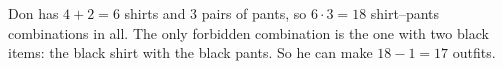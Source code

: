 Don has $4+2=6$ shirts and $3$ pairs of pants, so $6\cdot3=18$ shirt--pants combinations in all. The only forbidden combination is the one with two black items: the black shirt with the black pants. So he can make $18-1=\boxed{17}$ outfits.
